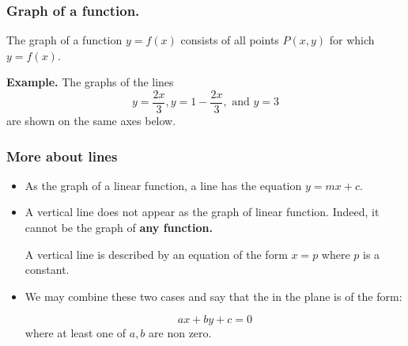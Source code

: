 \begin{frame}
  \frametitle{Graph of a function.}
  
 
    
    The graph of a function $y=f(x)$ consists of all points $P(x,y)$ for which $y=f(x)$.
    
    
    {\bf Example.} The graphs of the lines 
    $$y=\frac{2x}{3}, y=1-\frac{2x}{3}, \mbox{ and } y=3 $$
    are shown on the same axes below.
    
    
  {\centerline{}}

  
\end{frame}


\begin{frame}
  \frametitle{More about lines}
\begin{itemize}

\item As the graph of a linear function, a line has the equation $y=mx+c$.

\item A vertical line does not appear as the graph of linear function. Indeed, it cannot 
be the graph of {\bf any function.}


A vertical line is described by an equation of the form $x=p$ where $p$ is a constant.


\item We may combine these two cases and say that the
 in the 
plane is of the form:

$$ax+by+c=0$$
where at least one of $a,b$ are non zero.



\end{itemize}
  
\end{frame}

